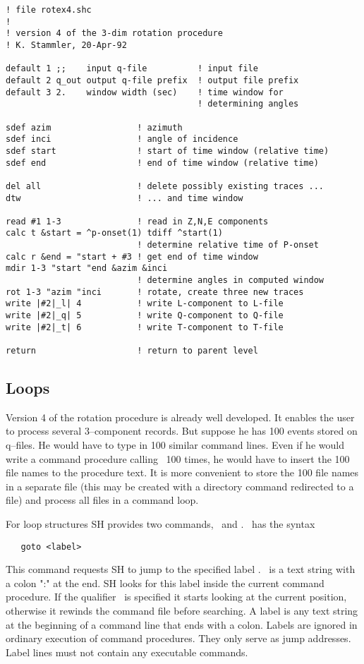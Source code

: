 \begin{verbatim}
! file rotex4.shc
!
! version 4 of the 3-dim rotation procedure
! K. Stammler, 20-Apr-92

default 1 ;;    input q-file          ! input file
default 2 q_out output q-file prefix  ! output file prefix
default 3 2.    window width (sec)    ! time window for
                                      ! determining angles

sdef azim                 ! azimuth
sdef inci                 ! angle of incidence
sdef start                ! start of time window (relative time)
sdef end                  ! end of time window (relative time)

del all                   ! delete possibly existing traces ...
dtw                       ! ... and time window

read #1 1-3               ! read in Z,N,E components
calc t &start = ^p-onset(1) tdiff ^start(1)
                          ! determine relative time of P-onset
calc r &end = "start + #3 ! get end of time window
mdir 1-3 "start "end &azim &inci
                          ! determine angles in computed window
rot 1-3 "azim "inci       ! rotate, create three new traces
write |#2|_l| 4           ! write L-component to L-file
write |#2|_q| 5           ! write Q-component to Q-file
write |#2|_t| 6           ! write T-component to T-file

return                    ! return to parent level
\end{verbatim}


\subsection{Loops}

Version 4 of the rotation procedure is already well developed.
It enables the user to process several 3--component records.  But
suppose he has 100 events stored on q--files.  He would have to
type in 100 similar command lines.  Even if he would write
a command procedure calling \ 100 times, he would have
to insert the 100 file names to the procedure text.  It is more
convenient to store the 100 file names in a separate file (this
may be created with a directory command redirected to a file) and
process all files in a command loop.

For loop structures SH provides two commands, \ and
.  \ has the syntax
\begin{verbatim}
   goto <label>
\end{verbatim}
This command requests SH to jump to the specified label
.  \ is a text string with a colon
":" at the end.  SH looks for this label inside the current
command procedure.  If the qualifier \ is specified
it starts looking at the current position, otherwise it rewinds
the command file before searching.  A label is any text string at
the beginning of a command line that ends with a colon.  Labels are
ignored in ordinary execution of command procedures.  They only serve
as jump addresses.  Label lines must not contain any executable
commands.

